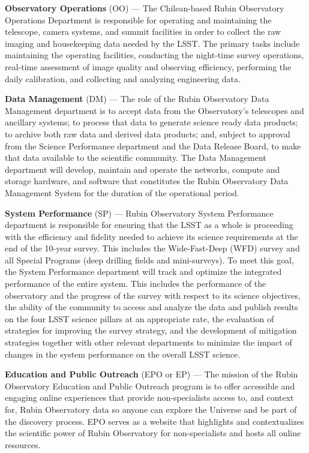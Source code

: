 \textbf{Observatory Operations} (OO) ---
The Chilean-based Rubin Observatory Operations Department is responsible for operating and maintaining the telescope, camera systems, and summit facilities in order to collect the raw imaging and housekeeping data needed by the LSST.
The primary tasks include maintaining the operating facilities, conducting the night-time survey operations, real-time assessment of image quality and observing efficiency, performing the daily calibration, and collecting and analyzing engineering data.

\textbf{Data Management} (DM) ---
The role of the Rubin Observatory Data Management department is to accept data from the Observatory's telescopes and ancillary systems; to process that data to generate science ready data products; to archive both raw data and derived data products; and, subject to approval from the Science Performance department and the Data Release Board, to make that data available to the scientific community.
The Data Management department will develop, maintain and operate the networks, compute and storage hardware, and software that constitutes the Rubin Observatory Data Management System for the duration of the operational period.

\textbf{System Performance} (SP) ---
Rubin Observatory System Performance department is responsible for ensuring that the LSST as a whole is proceeding with the efficiency and fidelity needed to achieve its science requirements at the end of the 10-year survey.
This includes the Wide-Fast-Deep (WFD) survey and all Special Programs (deep drilling fields and mini-surveys).
To meet this goal, the System Performance department will track and optimize the integrated performance of the entire system.
This includes the performance of the observatory and the progress of the survey with respect to its science objectives, the ability of the community to access and analyze the data and publish results on the four LSST science pillars at an appropriate rate, the evaluation of strategies for improving the survey strategy, and the development of mitigation strategies together with other relevant departments to minimize the impact of changes in the system performance on the overall LSST science.

\textbf{Education and Public Outreach} (EPO or EP) ---
The mission of the Rubin Observatory Education and Public Outreach program is to offer accessible and engaging online experiences that provide non-specialists access to, and context for, Rubin Observatory data so anyone can explore the Universe and be part of the discovery process.
EPO serves as a website that highlights and contextualizes the scientific power of Rubin Observatory for non-specialists and hosts all online resources.

